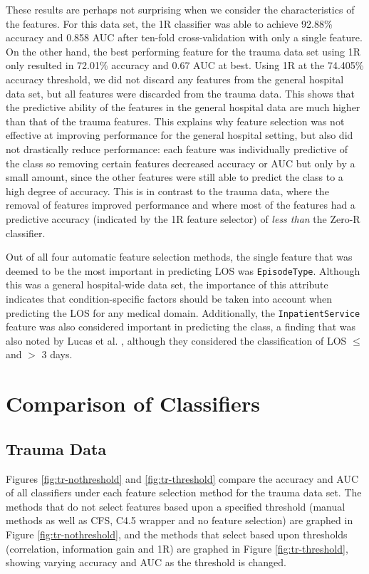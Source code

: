 These results are perhaps not surprising when we consider the characteristics
of the features. For this data set, the 1R classifier was able to achieve
92.88\% accuracy and
0.858 AUC after ten-fold cross-validation with only a single feature. On the
other hand, the best
performing feature for the trauma data set using 1R only resulted in 72.01\%
accuracy and 0.67 AUC at best. Using 1R at the 74.405\% accuracy threshold,
we did not discard any features from the general hospital data set, but all
features were discarded from the trauma data. This shows that the predictive
ability of the features in the general hospital data are much higher than
that of the trauma features. This explains why feature
selection was not effective at improving performance for the general hospital
setting, but also did not drastically reduce performance: each feature
was individually predictive of the
class so removing certain features decreased accuracy or AUC but only by a
small amount, since the other features were still able to predict the class
to a high degree of accuracy. This is in contrast to the trauma data, where
the removal of features improved performance and where most of the features
had a predictive accuracy (indicated by the 1R feature selector) of
\textit{less than} the Zero-R classifier.

Out of all four automatic feature selection methods, the single feature that
was deemed to be the most important in predicting LOS was \texttt{EpisodeType}.
Although this was a general hospital-wide data set, the importance of this
attribute indicates that condition-specific factors should be taken into
account when predicting the LOS for any medical domain. Additionally, the
\texttt{InpatientService} feature was also considered important in predicting
the class, a finding that was also noted by Lucas et al. \cite{Lucas2009},
although they considered the classification of LOS $\leq$ and $>$ 3 days.

\section{Comparison of Classifiers}
\subsection{Trauma Data}
Figures \ref{fig:tr-nothreshold} and \ref{fig:tr-threshold} compare the
accuracy and AUC of all classifiers under each feature selection method for
the trauma data set.
The methods that do not select features based upon a specified threshold
(manual methods as well as CFS, C4.5 wrapper and no feature selection)
are graphed in Figure \ref{fig:tr-nothreshold}, and the methods that select
based upon thresholds (correlation, information gain and 1R) are graphed
in Figure \ref{fig:tr-threshold}, showing varying accuracy and AUC as the
threshold is changed.

